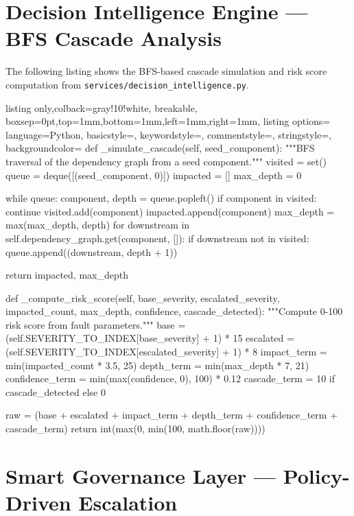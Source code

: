 \section{Decision Intelligence Engine — BFS Cascade Analysis}

The following listing shows the BFS-based cascade simulation and risk score computation from \texttt{services/decision\_intelligence.py}.

\begin{tcblisting}{listing only,colback=gray!10!white, breakable, boxsep=0pt,top=1mm,bottom=1mm,left=1mm,right=1mm,
listing options={
language=Python,
basicstyle=\small\ttfamily,
keywordstyle=\color{blue},
commentstyle=\color{gray},
stringstyle=\color{orange},
backgroundcolor=\color{gray!25}}}
def _simulate_cascade(self, seed_component):
    """BFS traversal of the dependency graph from a seed component."""
    visited = set()
    queue = deque([(seed_component, 0)])
    impacted = []
    max_depth = 0

    while queue:
        component, depth = queue.popleft()
        if component in visited:
            continue
        visited.add(component)
        impacted.append(component)
        max_depth = max(max_depth, depth)
        for downstream in self.dependency_graph.get(component, []):
            if downstream not in visited:
                queue.append((downstream, depth + 1))

    return impacted, max_depth

def _compute_risk_score(self, base_severity, escalated_severity,
                        impacted_count, max_depth,
                        confidence, cascade_detected):
    """Compute 0-100 risk score from fault parameters."""
    base     = (self.SEVERITY_TO_INDEX[base_severity] + 1) * 15
    escalated = (self.SEVERITY_TO_INDEX[escalated_severity] + 1) * 8
    impact_term    = min(impacted_count * 3.5, 25)
    depth_term     = min(max_depth * 7, 21)
    confidence_term = min(max(confidence, 0), 100) * 0.12
    cascade_term   = 10 if cascade_detected else 0

    raw = (base + escalated + impact_term + depth_term
           + confidence_term + cascade_term)
    return int(max(0, min(100, math.floor(raw))))
\end{tcblisting}

\section{Smart Governance Layer — Policy-Driven Escalation}

